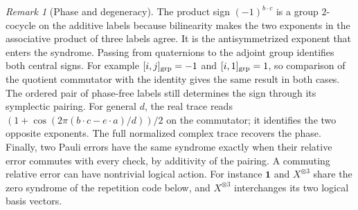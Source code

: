 \documentclass[11pt,reqno]{amsart}
\theoremstyle{definition}
\theoremstyle{remark}
\newtheorem{remark}[theorem]{Remark}
\numberwithin{equation}{section}
\begin{document}
\begin{remark}[Phase and degeneracy]\label{m7:phase-limits}
The product sign $(-1)^{b\cdot c}$ is a group $2$-cocycle on the
additive labels because bilinearity makes the two exponents in the
associative product of three labels agree. It is the antisymmetrized
exponent that enters the syndrome. Passing from quaternions to
the adjoint group identifies both central signs. For example
$[i,j]_{\rm grp}=-1$ and $[i,1]_{\rm grp}=1$, so comparison of
the quotient commutator with the identity gives the same result
in both cases. The ordered pair of phase-free labels still
determines the sign through its symplectic pairing. For general $d$, the
real trace reads $(1+\cos(2\pi(b\cdot c-e\cdot a)/d))/2$ on the
commutator; it identifies the two opposite exponents. The full
normalized complex trace recovers the phase. Finally, two Pauli
errors have the same syndrome exactly when their relative error
commutes with every check, by additivity of the pairing.
A commuting relative error can have nontrivial logical action.
For instance $\mathbf1$ and $X^{\otimes3}$ share the zero syndrome
of the repetition code below, and $X^{\otimes3}$ interchanges its
two logical basis vectors.
\end{remark}
\end{document}

